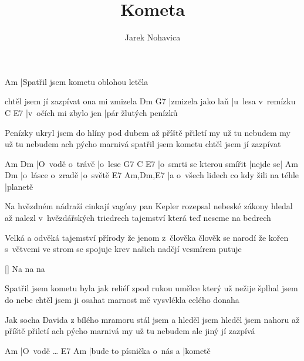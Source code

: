 \documentclass{song}
\title{Kometa}
\author{Jarek Nohavica}
\begin{document}
\strophe
Am
|Spatřil jsem kometu oblohou letěla

chtěl jsem jí zazpívat ona mi zmizela
Dm                G7
|zmizela jako laň |u~lesa v~remízku
C                     E7
|v~očích mi zbylo jen |pár žlutých penízků
\endstrophe

\strophe*
Penízky ukryl jsem do hlíny pod dubem
až příště přiletí my už tu nebudem
my už tu nebudem ach pýcho marnivá
spatřil jsem kometu chtěl jsem jí zazpívat
\endstrophe

Am              Dm
|O~vodě o~trávě |o~lese
G7                        C        E7
|o~smrti se kterou smířit |nejde se|
Am               Dm
|o~lásce o~zradě |o~světě
E7                                     Am,Dm,E7
|a o~všech lidech co kdy žili na téhle |planetě
\endstrophe

\strophe*
Na hvězdném nádraží cinkají vagóny
pan Kepler rozepsal nebeské zákony
hledal až nalezl v~hvězdářských triedrech
tajemství která teď neseme na bedrech
\endstrophe

\strophe*
Velká a odvěká tajemství přírody
že jenom z~člověka člověk se narodí
že kořen s~větvemi ve strom se spojuje
krev našich nadějí vesmírem putuje
\endstrophe

\ref{} Na na na

\strophe*
Spatřil jsem kometu byla jak reliéf
zpod rukou umělce který už nežije
šplhal jsem do nebe chtěl jsem ji osahat
marnost mě vysvlékla celého donaha
\endstrophe

\strophe*
Jak socha Davida z bílého mramoru
stál jsem a hleděl jsem hleděl jsem nahoru
až příště přiletí ach pýcho marnivá
my už tu nebudem ale jiný jí zazpívá
\endstrophe

Am
|O~vodě \ldots{}
E7                        Am
|bude to písnička o~nás a |kometě
\endstrophe
\end{document}
